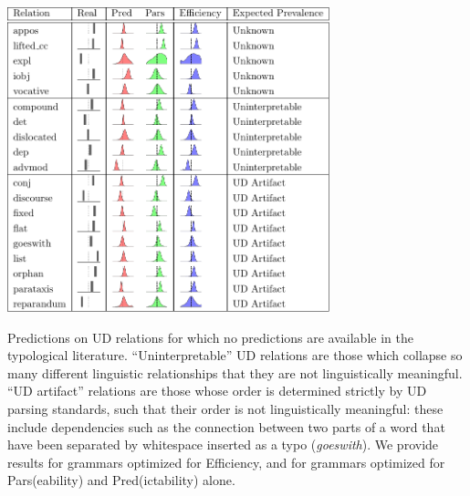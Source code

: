 \documentclass[10pt,twoside,lineno]{article}
\begin{document}





\begin{table} %
	\begin{center}	
\includegraphics[width=0.7\textwidth]{si-table-perrel-2a-1.png}  
\end{center}
\caption{Predictions on UD relations for which no predictions are available in the typological literature.  ``Uninterpretable'' UD relations are those which collapse so many different linguistic relationships that they are not linguistically meaningful. ``UD artifact'' relations are those whose order is determined strictly by UD parsing standards, such that their order is not linguistically meaningful: these include dependencies such as the connection between two parts of a word that have been separated by whitespace inserted as a typo (\emph{goeswith}).
We provide results for grammars optimized for Efficiency, and for grammars optimized for Pars(eability) and Pred(ictability) alone.
}
\label{tab:all-predictions-2}
\end{table}
\end{document}
